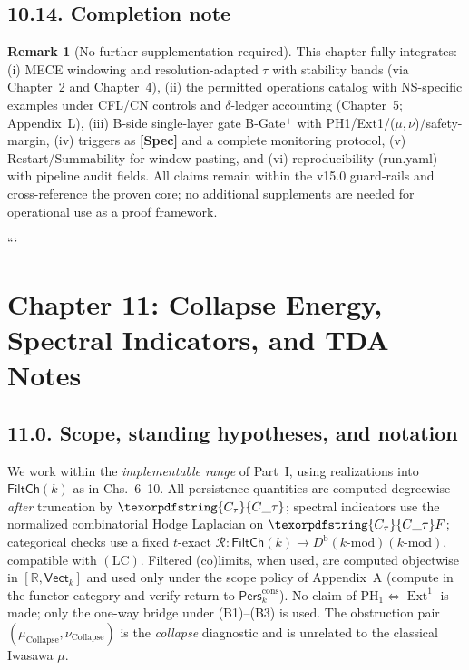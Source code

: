 \documentclass[11pt]{article}
\DeclareMathOperator{\Ext}{Ext}
\DeclareRobustCommand{\hyp}{\nobreakdash-}
\newcommand{\Pers}{\mathsf{Pers}}
\newcommand{\Rfun}{\mathcal{R}}
\numberwithin{equation}{section}
\theoremstyle{definition}
\newtheorem{remark}[theorem]{Remark}
\DeclareRobustCommand{\FiltCh}[1]{\mathsf{FiltCh}(#1)}
\DeclareRobustCommand{\Ctau}{\texorpdfstring{\ensuremath{C_{\tau}}}{C\_\tau}}
\DeclareRobustCommand{\Db}{D^{\mathrm{b}}(k\text{-mod})}
\DeclareRobustCommand{\muc}{\mu_{\mathrm{Collapse}}}
\DeclareRobustCommand{\nuc}{\nu_{\mathrm{Collapse}}}
\DeclareRobustCommand{\LC}{\texorpdfstring{\ensuremath{\mathrm{(LC)}}}{(LC)}}
\begin{document}
\subsection*{10.14. Completion note}
\begin{remark}[No further supplementation required]
This chapter fully integrates: (i) MECE windowing and resolution\hyp adapted \(\tau\) with stability bands (via Chapter~2 and Chapter~4), (ii) the permitted operations catalog with NS\hyp specific examples under CFL/CN controls and \(\delta\)\hyp ledger accounting (Chapter~5; Appendix~L), (iii) B\hyp side single\hyp layer gate B\hyp Gate\(^{+}\) with PH1/Ext1/(\(\mu,\nu\))/safety\hyp margin, (iv) triggers as \textbf{[Spec]} and a complete monitoring protocol, (v) Restart/Summability for window pasting, and (vi) reproducibility (run.yaml) with pipeline audit fields. All claims remain within the v15.0 guard\hyp rails and cross\hyp reference the proven core; no additional supplements are needed for operational use as a proof framework.
\end{remark}
```


\section{Chapter 11: Collapse Energy, Spectral Indicators, and TDA Notes}

\subsection*{11.0. Scope, standing hypotheses, and notation}
We work within the \emph{implementable range} of Part~I, using realizations into $\FiltCh{k}$ as in Chs.~6–10. All persistence quantities are computed degreewise \emph{after} truncation by $\Ctau$; spectral indicators use the normalized combinatorial Hodge Laplacian on $\Ctau F$; categorical checks use a fixed $t$-exact $\Rfun:\FiltCh{k}\to\Db(k\text{-mod})$, compatible with \LC. Filtered (co)limits, when used, are computed objectwise in $[\mathbb{R},\mathsf{Vect}_k]$ and used only under the scope policy of Appendix~A (compute in the functor category and verify return to $\Pers^{\mathrm{cons}}_k$). No claim of $\mathrm{PH}_1\Leftrightarrow \Ext^1$ is made; only the one-way bridge under (B1)–(B3) is used. The obstruction pair $(\muc,\nuc)$ is the \emph{collapse} diagnostic and is unrelated to the classical Iwasawa $\mu$.
\end{document}
